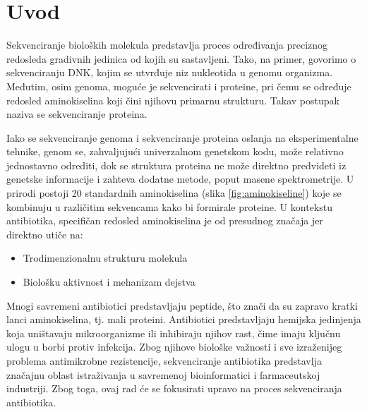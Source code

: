 \documentclass[12pt,oneside]{memoir}
\begin{document}

\frontmatter
\naslovna
\komisija
{}
\apstrakt
\tableofcontents*

\mainmatter

\chapter{Uvod}
Sekvenciranje bioloških molekula predstavlja proces određivanja preciznog redosleda gradivnih jedinica od kojih su sastavljeni. Tako, na primer, govorimo o sekvenciranju DNK, kojim se utvrđuje niz nukleotida u genomu organizma. Međutim, osim genoma, moguće je sekvencirati i proteine, pri čemu se određuje redosled aminokiselina koji čini njihovu primarnu strukturu. Takav postupak naziva se sekvenciranje proteina.

Iako se sekvenciranje genoma i sekvenciranje proteina oslanja na eksperimentalne tehnike, genom se, zahvaljujući univerzalnom genetskom kodu, može relativno jednostavno odrediti, dok se struktura proteina ne može direktno predvideti iz genetske informacije i zahteva dodatne metode, poput masene spektrometrije. U prirodi postoji 20 standardnih aminokiselina (slika \ref{fig:aminokiseline}) koje se kombinuju u različitim sekvencama kako bi formirale proteine. U kontekstu antibiotika, specifičan redosled aminokiselina je od presudnog značaja jer direktno utiče na:

\begin{itemize}
    \item Trodimenzionalnu strukturu molekula
    \item Biološku aktivnost i mehanizam dejstva
\end{itemize}

Mnogi savremeni antibiotici predstavljaju peptide, što znači da su zapravo kratki lanci aminokiselina, tj. mali proteini. Antibiotici predstavljaju hemijska jedinjenja koja uništavaju mikroorganizme ili inhibiraju njihov rast, čime imaju ključnu ulogu u borbi protiv infekcija. Zbog njihove biološke važnosti i sve izraženijeg problema antimikrobne rezistencije, sekvenciranje antibiotika predstavlja značajnu oblast istraživanja u savremenoj bioinformatici i farmaceutskoj industriji. Zbog toga, ovaj rad će se fokusirati upravo na proces sekvenciranja antibiotika.
\end{document}
